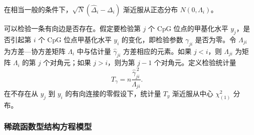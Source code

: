 在相当一般的条件下，$\sqrt N(\widehat\Delta_i-\Delta_i)$ 渐近服从正态分布 $N(0,\Lambda_i)$。

可以检验一条有向边是否存在。假定要检验第 $j$ 个 CpG 位点的甲基化水平 $y_j$，是否引起第 $i$ 个 CpG 位点甲基化水平 $y_i$ 的变化，即检验参数 $\gamma_{ji}$ 是否为零。令 $\Lambda_{ji}$ 为方差—协方差矩阵 $\Lambda_i$ 中与估计量 $\widehat\gamma_{ji}$ 方差相应的元素。如果 $j<i$，则 $\Lambda_{ji}$ 为矩阵 $\Lambda_i$ 的第 $j$ 个对角元；如果 $j>i$，则为第 $j-1$ 个对角元。定义检验统计量
\begin{equation}
T_\gamma=n\frac{\widehat\gamma_{ji}^{\,2}}{\Lambda_{ji}}.
\tag{5.68}
\end{equation}
在不存在从 $y_j$ 到 $y_i$ 的有向连接的零假设下，统计量 $T_y$ 渐近服从中心 $\chi^2_{(1)}$ 分布。

\subsubsection{稀疏函数型结构方程模型}

